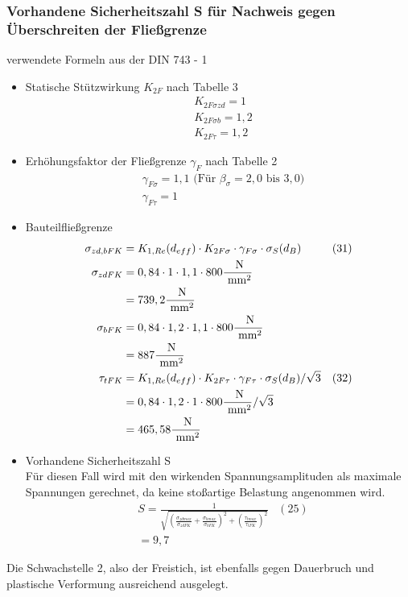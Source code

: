 \subsubsection{Vorhandene Sicherheitszahl S für Nachweis gegen Überschreiten der Fließgrenze}
verwendete Formeln aus der DIN 743 - 1
\begin{itemize}
	\item Statische Stützwirkung $K_{2F}$ nach Tabelle 3
	\begin{align*}
	&K_{2F \sigma zd} = 1 \\
	&K_{2F \sigma b} = 1,2 \\
	&K_{2F \tau} = 1,2 
	\end{align*}
	\item Erhöhungsfaktor der Fließgrenze $\gamma_{F}$ nach Tabelle 2
	\begin{align*}
	&\gamma_{F\sigma} = 1,1 \text{ (Für } \beta_{\sigma} = 2,0 \text{ bis } 3,0 \text{)} \\
	&\gamma_{F\tau} = 1 
	\end{align*}
	\item Bauteilfließgrenze
	\begin{align*}
	\sigma_{zd,bFK} &= K_{1,Re} (d_{eff}) \cdot K_{2F \sigma} \cdot \gamma_{F\sigma} \cdot \sigma_S (d_B) & (31) \\
	\sigma_{zdFK}&= 0,84 \cdot 1 \cdot 1,1 \cdot 800 \frac{\text{ N}}{\text{ mm}^2} \\
	&= 739,2 \frac{\text{ N}}{\text{ mm}^2}\\
	\sigma_{bFK}&= 0,84 \cdot 1,2 \cdot 1,1 \cdot 800 \frac{\text{ N}}{\text{ mm}^2} \\
	&= 887\frac{\text{ N}}{\text{ mm}^2}\\
	\tau_{tFK} &= K_{1,Re} (d_{eff}) \cdot K_{2F \tau} \cdot \gamma_{F\tau} \cdot \sigma_S (d_B) / \sqrt{3} &(32) \\
	&= 0,84 \cdot 1,2 \cdot 1 \cdot 800 \frac{\text{ N}}{\text{ mm}^2} / \sqrt{3}\\
	&= 465,58 \frac{\text{ N}}{\text{ mm}^2}
	\end{align*}
	\item Vorhandene Sicherheitszahl S \\
	Für diesen Fall wird mit den wirkenden Spannungsamplituden als maximale Spannungen gerechnet, da keine stoßartige Belastung angenommen wird. 
	\begin{align*}
	&S = \frac{1}{\sqrt{\left( \frac{\sigma_{zdmax}}{\sigma_{zdFK}}+\frac{\sigma_{bmax}}{\sigma_{bFK}} \right)^2 +\left( \frac{\tau_{tmax}}{\tau_{tFK}} \right)^2 }} & (25)\\
	&= 9,7 
	\end{align*}
\end{itemize}
Die Schwachstelle 2, also der Freistich, ist ebenfalls gegen Dauerbruch und plastische Verformung ausreichend ausgelegt.